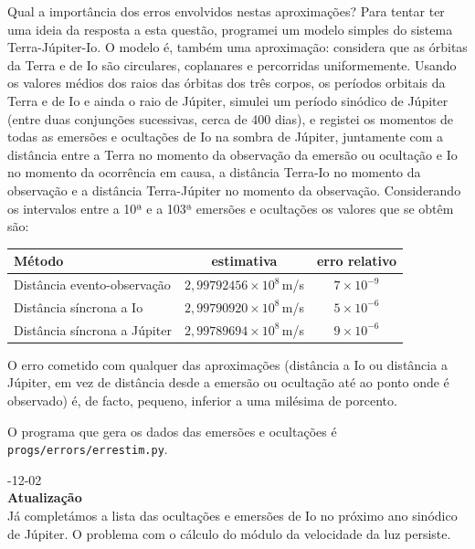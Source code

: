 \documentclass[]{article}
\newcommand{\newlog}[2]{%
  \par
  \vspace{\baselineskip}
  \noindent
  #1\\
  \textbf{#2}\\
}
\begin{document}
Qual a importância dos erros envolvidos nestas aproximações? Para tentar ter uma
ideia da resposta a esta questão, programei um modelo simples do sistema
Terra-Júpiter-Io. O modelo é, também uma aproximação: considera que as órbitas
da Terra e de Io são circulares, coplanares e percorridas uniformemente. Usando
os valores médios dos raios das órbitas dos três corpos, os períodos orbitais
da Terra e de Io e ainda o raio de Júpiter, simulei um período sinódico de
Júpiter (entre duas conjunções sucessivas, cerca de 400 dias), e registei os
momentos de todas as emersões e ocultações de Io na sombra de Júpiter,
juntamente com a distância entre a Terra no momento da observação da emersão ou
ocultação e Io no momento da ocorrência em causa, a distância Terra-Io no
momento da observação e a distância Terra-Júpiter no momento da observação.
Considerando os intervalos entre a 10ª e a 103ª emersões e ocultações os valores
que se obtêm são:
\begin{center}
  \begin{tabular}{l|c|c}
    \hline
    Método & estimativa & erro relativo\\
    \hline
    Distância evento-observação  & $2,99792456\times10^8$\,m/s
                                        & $7\times10^{-9}$\\
    Distância síncrona a Io      & $2,99790920\times10^8$\,m/s
                                        & $5\times10^{-6}$\\
    Distância síncrona a Júpiter & $2,99789694\times10^8$\,m/s
                                        & $9\times10^{-6}$\\
    \hline
  \end{tabular}
\end{center}
O erro cometido com qualquer das aproximações (distância a Io ou distância a
Júpiter, em vez de distância desde a emersão ou ocultação até ao ponto onde é
observado) é, de facto, pequeno, inferior a uma milésima de porcento.

\noindent
O programa que gera os dados das emersões e ocultações é
\texttt{progs/errors/errestim.py}.

\newlog{2024-12-02}{Atualização}
Já completámos a lista das ocultações e emersões de Io no próximo ano sinódico
de Júpiter. O problema com o cálculo do módulo da velocidade da luz persiste.
\end{document}
